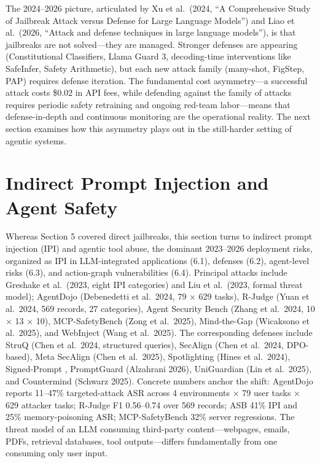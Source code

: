 \documentclass{article}
\begin{document}
The 2024--2026 picture, articulated by Xu et al.~(2024, ``A Comprehensive Study of Jailbreak Attack versus Defense for Large Language Models'') and Liao et al.~(2026, ``Attack and defense techniques in large language models''), is that jailbreaks are not solved---they are managed. Stronger defenses are appearing (Constitutional Classifiers, Llama Guard 3, decoding-time interventions like SafeInfer, Safety Arithmetic), but each new attack family (many-shot, FigStep, PAP) requires defense iteration. The fundamental cost asymmetry---a successful attack costs \$0.02 in API fees, while defending against the family of attacks requires periodic safety retraining and ongoing red-team labor---means that defense-in-depth and continuous monitoring are the operational reality. The next section examines how this asymmetry plays out in the still-harder setting of agentic systems.

\section{Indirect Prompt Injection and Agent Safety}\label{indirect-prompt-injection-and-agent-safety}

Whereas Section 5 covered direct jailbreaks, this section turns to indirect prompt injection (IPI) and agentic tool abuse, the dominant 2023--2026 deployment risks, organized as IPI in LLM-integrated applications (6.1), defenses (6.2), agent-level risks (6.3), and action-graph vulnerabilities (6.4). Principal attacks include Greshake et al.~(2023, eight IPI categories) and Liu et al.~(2023, formal threat model); AgentDojo (Debenedetti et al.~2024, 79 × 629 tasks), R-Judge (Yuan et al.~2024, 569 records, 27 categories), Agent Security Bench (Zhang et al.~2024, 10 × 13 × 10), MCP-SafetyBench (Zong et al.~2025), Mind-the-Gap (Wicaksono et al.~2025), and WebInject (Wang et al.~2025). The corresponding defenses include StruQ (Chen et al.~2024, structured queries), SecAlign (Chen et al.~2024, DPO-based), Meta SecAlign (Chen et al.~2025), Spotlighting (Hines et al.~2024), Signed-Prompt \citep{suo2024arxiv2401076122024}, PromptGuard (Alzahrani 2026), UniGuardian (Lin et al.~2025), and Countermind (Schwarz 2025). Concrete numbers anchor the shift: AgentDojo reports 11--47\% targeted-attack ASR across 4 environments × 79 user tasks × 629 attacker tasks; R-Judge F1 0.56--0.74 over 569 records; ASB 41\% IPI and 25\% memory-poisoning ASR; MCP-SafetyBench 32\% server regressions. The threat model of an LLM consuming third-party content---webpages, emails, PDFs, retrieval databases, tool outputs---differs fundamentally from one consuming only user input.
\end{document}
